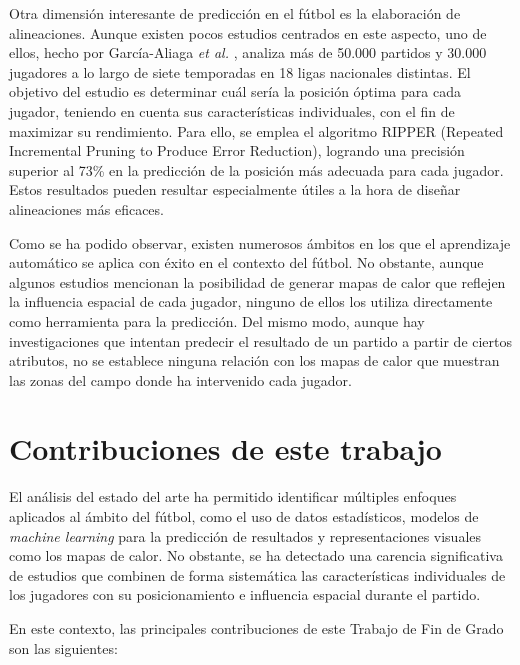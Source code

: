 Otra dimensión interesante de predicción en el fútbol es la elaboración de alineaciones. Aunque existen pocos estudios centrados en este aspecto, uno de ellos, hecho por García-Aliaga \textit{et al.} \cite{starting-up}, analiza más de 50.000 partidos y 30.000 jugadores a lo largo de siete temporadas en 18 ligas nacionales distintas. El objetivo del estudio es determinar cuál sería la posición óptima para cada jugador, teniendo en cuenta sus características individuales, con el fin de maximizar su rendimiento. Para ello, se emplea el algoritmo RIPPER (Repeated Incremental Pruning to Produce Error Reduction), logrando una precisión superior al 73\% en la predicción de la posición más adecuada para cada jugador. Estos resultados pueden resultar especialmente útiles a la hora de diseñar alineaciones más eficaces.

Como se ha podido observar, existen numerosos ámbitos en los que el aprendizaje automático se aplica con éxito en el contexto del fútbol. No obstante, aunque algunos estudios mencionan la posibilidad de generar mapas de calor que reflejen la influencia espacial de cada jugador, ninguno de ellos los utiliza directamente como herramienta para la predicción. Del mismo modo, aunque hay investigaciones que intentan predecir el resultado de un partido a partir de ciertos atributos, no se establece ninguna relación con los mapas de calor que muestran las zonas del campo donde ha intervenido cada jugador.

\section{Contribuciones de este trabajo}
El análisis del estado del arte ha permitido identificar múltiples enfoques aplicados al ámbito del fútbol, como el uso de datos estadísticos, modelos de \textit{machine learning} para la predicción de resultados y representaciones visuales como los mapas de calor. No obstante, se ha detectado una carencia significativa de estudios que combinen de forma sistemática las características individuales de los jugadores con su posicionamiento e influencia espacial durante el partido.

En este contexto, las principales contribuciones de este Trabajo de Fin de Grado son las siguientes:

